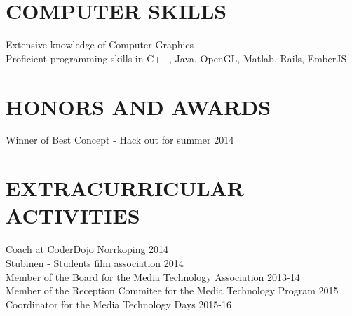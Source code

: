 \documentclass{res}
\begin{document}
\begin{resume}
\section{COMPUTER SKILLS}          
    Extensive knowledge of Computer Graphics \\         
    Proficient programming skills in C++, Java, OpenGL, Matlab, Rails, EmberJS
 
 
\section{HONORS AND AWARDS}          
    Winner of Best Concept - Hack out for summer 2014   
 
\section{EXTRACURRICULAR ACTIVITIES}          
    Coach at CoderDojo Norrkoping 2014\\         
    Stubinen - Students film association 2014\\     
    Member of the Board for the Media Technology Association  2013-14\\ 
    Member of the Reception Commitee for the Media Technology Program  2015\\
    Coordinator for the Media Technology Days 2015-16\\ 

           
 
\end{resume}
\end{document}
